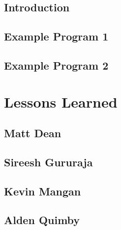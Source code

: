 \documentclass[oneside]{book}
\begin{document}
\section{Introduction}

\section{Example Program 1}

\section{Example Program 2}


\chapter{Lessons Learned}

\section{Matt Dean}

\section{Sireesh Gururaja}

\section{Kevin Mangan}

\section{Alden Quimby}
\end{document}
